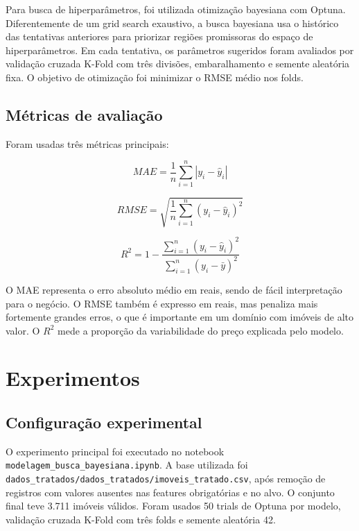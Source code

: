 \documentclass[12pt,a4paper]{article}
\begin{document}
Para busca de hiperparâmetros, foi utilizada otimização bayesiana com Optuna. Diferentemente de um grid search exaustivo, a busca bayesiana usa o histórico das tentativas anteriores para priorizar regiões promissoras do espaço de hiperparâmetros. Em cada tentativa, os parâmetros sugeridos foram avaliados por validação cruzada K-Fold com três divisões, embaralhamento e semente aleatória fixa. O objetivo de otimização foi minimizar o RMSE médio nos folds.

\subsection{Métricas de avaliação}

Foram usadas três métricas principais:

\begin{equation}
MAE = \frac{1}{n}\sum_{i=1}^{n}|y_i - \hat{y}_i|
\end{equation}

\begin{equation}
RMSE = \sqrt{\frac{1}{n}\sum_{i=1}^{n}(y_i - \hat{y}_i)^2}
\end{equation}

\begin{equation}
R^2 = 1 - \frac{\sum_{i=1}^{n}(y_i - \hat{y}_i)^2}{\sum_{i=1}^{n}(y_i - \bar{y})^2}
\end{equation}

O MAE representa o erro absoluto médio em reais, sendo de fácil interpretação para o negócio. O RMSE também é expresso em reais, mas penaliza mais fortemente grandes erros, o que é importante em um domínio com imóveis de alto valor. O $R^2$ mede a proporção da variabilidade do preço explicada pelo modelo.

\section{Experimentos}

\subsection{Configuração experimental}

O experimento principal foi executado no notebook \texttt{modelagem\_busca\_bayesiana.ipynb}. A base utilizada foi \texttt{dados\_tratados/dados\_tratados/imoveis\_tratado.csv}, após remoção de registros com valores ausentes nas features obrigatórias e no alvo. O conjunto final teve 3.711 imóveis válidos. Foram usados 50 trials de Optuna por modelo, validação cruzada K-Fold com três folds e semente aleatória 42.
\end{document}
